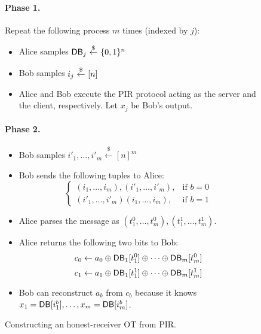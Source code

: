 \begin{figure}

\begin{minipage}{\textwidth}
\begin{mdframed}
\paragraph{Phase 1.} 
Repeat the following process $m$ times (indexed by $j$):
\begin{itemize}
    \item Alice samples ${\sf DB}_j ~{\overset{\$}{\leftarrow}}~ \{0,1\}^n$
    \item Bob samples $ i_j ~{\overset{\$}{\leftarrow}}~ [n]$
    \item Alice and Bob execute the PIR protocol acting as the server and the client, respectively. Let $x_j$ be Bob's output.
\end{itemize}

\paragraph{Phase 2.} 
\begin{itemize}
    \item Bob samples \( i'_1, \ldots, i'_m \stackrel{\$}{\leftarrow} [n]^m \)
    \item Bob sends the following tuples to Alice:
        \[
        \left\{
          \begin{array}{ll}
            (i_1, \ldots, i_m), (i'_1, \ldots, i'_m), & \text{if } b = 0 \\
            (i'_1, \ldots, i'_m)(i_1, \ldots, i_m), & \text{if } b = 1
          \end{array}
        \right.
        \]
    \item Alice parses the message as $(t^0_1, \ldots, t^0_m), (t^1_1, \ldots, t^1_m)$.
    \item Alice returns the following two bits to Bob:
    \[
    c_0\leftarrow a_0\oplus {\sf DB}_{1}[t^0_1] \oplus \dots \oplus {\sf DB}_{m}[t^0_m]
    \]
    \[
    c_1\leftarrow a_1\oplus {\sf DB}_{1}[t^1_1] \oplus \dots \oplus {\sf DB}_{m}[t^1_m]
    \]
    
    \item  Bob can reconstruct $a_b$ from $c_b$ because it knows $x_1={\sf DB}[i^b_1],\dots,x_m={\sf DB}[i^b_m]$.
    
\end{itemize}

\end{mdframed}
\end{minipage}
\caption{Constructing an honest-receiver OT from PIR. \label{fig:OT-from-PIR}}
\end{figure}

